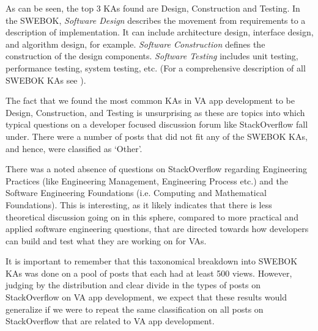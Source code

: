 \documentclass{sigchi}
\begin{document}
As can be seen, the top 3 KAs found are Design, Construction and Testing. In the SWEBOK, \textit{Software Design} describes the movement from requirements to a description of implementation. It can include architecture design, interface design, and algorithm design, for example. \textit{Software Construction} defines the construction of the design components. \textit{Software Testing} includes unit testing, performance testing, system testing, etc. (For a comprehensive description of all SWEBOK KAs see \cite{hilburn1999software}).

The fact that we found the most common KAs in VA app development to be Design, Construction, and Testing is unsurprising as these are topics into which typical questions on a developer focused discussion forum like StackOverflow fall under. There were a number of posts that did not fit any of the SWEBOK KAs, and hence, were classified as `Other'. 

There was a noted absence of questions on StackOverflow regarding Engineering Practices (like Engineering Management, Engineering Process etc.) and the Software Engineering Foundations (i.e. Computing and Mathematical Foundations). This is interesting, as it likely indicates that there is less theoretical discussion going on in this sphere, compared to more practical and applied software engineering questions, that are directed towards how developers can build and test what they are working on for VAs. 

It is important to remember that this taxonomical breakdown into SWEBOK KAs was done on a pool of posts that each had at least 500 views. However, judging by the distribution and clear divide in the types of posts on StackOverflow on VA app development, we expect that these results would generalize if we were to repeat the same classification on all posts on StackOverflow that are related to VA app development.
\end{document}

